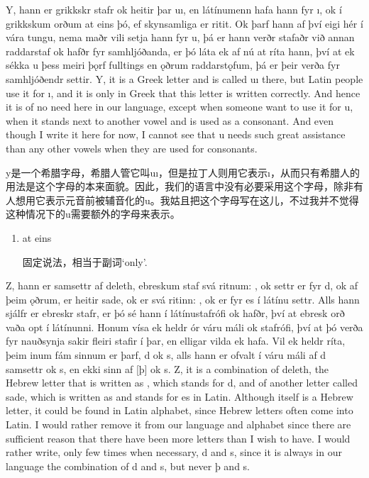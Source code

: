 \begin{paracol}{2}
    Y, hann er grikkskr stafr ok heitir þar uı, en látínumenn hafa hann fyr ı, ok í grikkskum orðum at eins þó, ef skynsamliga er ritit. Ok þarf hann af því eigi hér í vára tungu, nema maðr vili setja hann fyr u, þá er hann verðr stafaðr við annan raddarstaf ok hafðr fyr samhljóðanda, er þó láta ek af nú at ríta hann, því at ek sékka u þess meiri þǫrf fulltings en ǫðrum raddarstǫfum, þá er þeir verða fyr samhljóðendr settir.
    \switchcolumn
    Y, it is a Greek letter and is called uı there, but Latin people use it for ı, and it is only in Greek that this letter is written correctly. And hence it is of no need here in our language, except when someone want to use it for u, when it stands next to another vowel and is used as a consonant. And even though I write it here for now, I cannot see that u needs such great assistance than any other vowels when they are used for consonants.
\end{paracol}
\begin{translation*}{}
    y是一个希腊字母，希腊人管它叫uı，但是拉丁人则用它表示ı，从而只有希腊人的用法是这个字母的本来面貌。因此，我们的语言中没有必要采用这个字母，除非有人想用它表示元音前被辅音化的u。我姑且把这个字母写在这儿，不过我并不觉得这种情况下的u需要额外的字母来表示。
\end{translation*}
\begin{grammar*}{}
    \begin{enumerate}[leftmargin=*]
        \item at eins

              固定说法，相当于副词`only'.
    \end{enumerate}
\end{grammar*}
\begin{paracol}{2}
    Z, hann er samsettr af deleth, ebreskum staf svá ritnum: , ok settr er fyr d, ok af þeim ǫðrum, er heitir sade, ok er svá ritinn: , ok er fyr es í látínu settr. Alls hann sjálfr er ebreskr stafr, er þó sé hann í látínustafrófi ok hafðr, því at ebresk orð vaða opt í látínunni. Honum vísa ek heldr ór váru máli ok stafrófi, því at þó verða fyr nauðsynja sakir fleiri stafir í þar, en elligar vilda ek hafa. Vil ek heldr ríta, þeim inum fám sinnum er þarf, d ok s, alls hann er ofvalt í váru máli af d samsettr ok s, en ekki sinn af [þ] ok s.
    \switchcolumn
    Z, it is a combination of deleth, the Hebrew letter that is written as , which stands for d, and of another letter called sade, which is written as  and stands for es in Latin. Although itself is a Hebrew letter, it could be found in Latin alphabet, since Hebrew letters often come into Latin. I would rather remove it from our language and alphabet since there are sufficient reason that there have been more letters than I wish to have. I would rather write, only few times when necessary, d and s, since it is always in our language the combination of d and s, but never þ and s.
\end{paracol}
